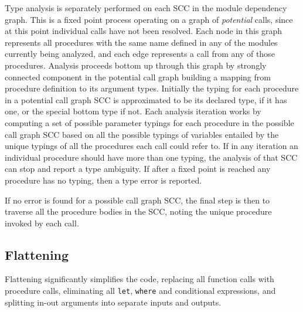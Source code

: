 \documentclass{article}
\begin{document}
Type analysis is separately performed on each SCC in the module
dependency graph.
This is a fixed point process operating on a graph of \emph{potential} calls,
since at this point individual calls have not been resolved.
Each node in this graph represents all procedures with the same name defined
in any of the modules currently being analyzed, and each edge represents
a call from any of those procedures.
Analysis proceeds bottom up through this graph by strongly connected component
in the potential call graph
building a mapping from procedure definition to its argument types.
Initially the typing for each procedure in a potential call graph SCC
is approximated to be its declared type,
if it has one, or the special bottom type if not.
Each analysis iteration works by computing a set of possible parameter
typings for each procedure in the possible call graph SCC
based on all the possible typings of variables entailed by
the unique typings of all the procedures each call could refer to.
If in any iteration an individual procedure should have more than
one typing, the analysis of that SCC can stop and report a type ambiguity.
If after a fixed point is reached any procedure has no typing,
then a type error is reported.

If no error is found for a possible call graph SCC,
the final step is then to traverse all the procedure
bodies in the SCC, noting the unique procedure invoked by
each call.


\subsection{Flattening}
\label{sec:flattening}

Flattening significantly simplifies the code,
replacing all function calls with procedure calls,
eliminating all \texttt{let}, \texttt{where} and conditional
expressions, and splitting in-out arguments
into separate inputs and outputs.
\end{document}
